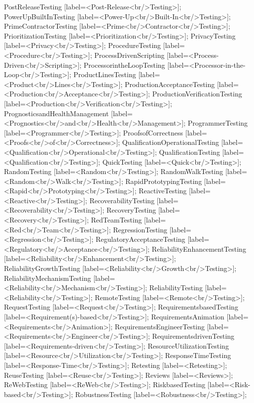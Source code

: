 \documentclass{article}
\begin{document}
{PostReleaseTesting [label=<Post-Release<br/>Testing>];
PowerUpBuiltInTesting [label=<Power-Up<br/>Built-In<br/>Testing>];
PrimeContractorTesting [label=<Prime<br/>Contractor<br/>Testing>];
PrioritizationTesting [label=<Prioritization<br/>Testing>];
PrivacyTesting [label=<Privacy<br/>Testing>];
ProcedureTesting [label=<Procedure<br/>Testing>];
ProcessDrivenScripting [label=<Process-Driven<br/>Scripting>];
ProcessorintheLoopTesting [label=<Processor-in-the-Loop<br/>Testing>];
ProductLinesTesting [label=<Product<br/>Lines<br/>Testing>];
ProductionAcceptanceTesting [label=<Production<br/>Acceptance<br/>Testing>];
ProductionVerificationTesting [label=<Production<br/>Verification<br/>Testing>];
PrognosticsandHealthManagement [label=<Prognostics<br/>and<br/>Health<br/>Management>];
ProgrammerTesting [label=<Programmer<br/>Testing>];
ProofsofCorrectness [label=<Proofs<br/>of<br/>Correctness>];
QualificationOperationalTesting [label=<Qualification<br/>Operational<br/>Testing>];
QualificationTesting [label=<Qualification<br/>Testing>];
QuickTesting [label=<Quick<br/>Testing>];
RandomTesting [label=<Random<br/>Testing>];
RandomWalkTesting [label=<Random<br/>Walk<br/>Testing>];
RapidPrototypingTesting [label=<Rapid<br/>Prototyping<br/>Testing>];
ReactiveTesting [label=<Reactive<br/>Testing>];
RecoverabilityTesting [label=<Recoverability<br/>Testing>];
RecoveryTesting [label=<Recovery<br/>Testing>];
RedTeamTesting [label=<Red<br/>Team<br/>Testing>];
RegressionTesting [label=<Regression<br/>Testing>];
RegulatoryAcceptanceTesting [label=<Regulatory<br/>Acceptance<br/>Testing>];
ReliabilityEnhancementTesting [label=<Reliability<br/>Enhancement<br/>Testing>];
ReliabilityGrowthTesting [label=<Reliability<br/>Growth<br/>Testing>];
ReliabilityMechanismTesting [label=<Reliability<br/>Mechanism<br/>Testing>];
ReliabilityTesting [label=<Reliability<br/>Testing>];
RemoteTesting [label=<Remote<br/>Testing>];
RequestTesting [label=<Request<br/>Testing>];
RequirementsbasedTesting [label=<Requirement(s)-based<br/>Testing>];
RequirementsAnimation [label=<Requirements<br/>Animation>];
RequirementsEngineerTesting [label=<Requirements<br/>Engineer<br/>Testing>];
RequirementsdrivenTesting [label=<Requirements-driven<br/>Testing>];
ResourceUtilizationTesting [label=<Resource<br/>Utilization<br/>Testing>];
ResponseTimeTesting [label=<Response-Time<br/>Testing>];
Retesting [label=<Retesting>];
ReuseTesting [label=<Reuse<br/>Testing>];
Reviews [label=<Reviews>];
ReWebTesting [label=<ReWeb<br/>Testing>];
RiskbasedTesting [label=<Risk-based<br/>Testing>];
RobustnessTesting [label=<Robustness<br/>Testing>];
}
\end{document}

